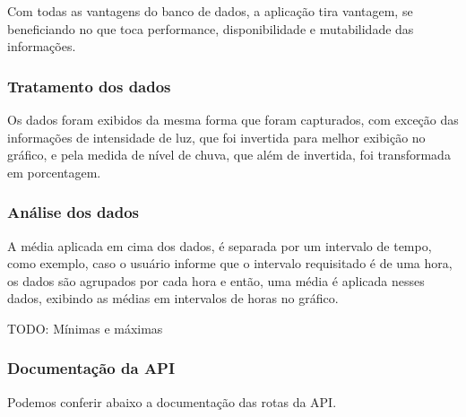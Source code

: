 Com todas as vantagens do banco de dados, a aplicação tira vantagem, se beneficiando no que toca performance, disponibilidade e mutabilidade das informações.

\subsubsection{Tratamento dos dados}

Os dados foram exibidos da mesma forma que foram capturados, com exceção das informações de intensidade de luz, que foi invertida para melhor exibição no gráfico, e pela medida de nível de chuva, que além de invertida, foi transformada em porcentagem.

\subsubsection{Análise dos dados}


A média aplicada em cima dos dados, é separada por um intervalo de tempo, como exemplo, caso o usuário informe que o intervalo requisitado é de uma hora, os dados são agrupados por cada hora e então, uma média é aplicada nesses dados, exibindo as médias em intervalos de horas no gráfico.


TODO: Mínimas e máximas

\subsubsection{Documentação da API}

Podemos conferir abaixo a documentação das rotas da API.

